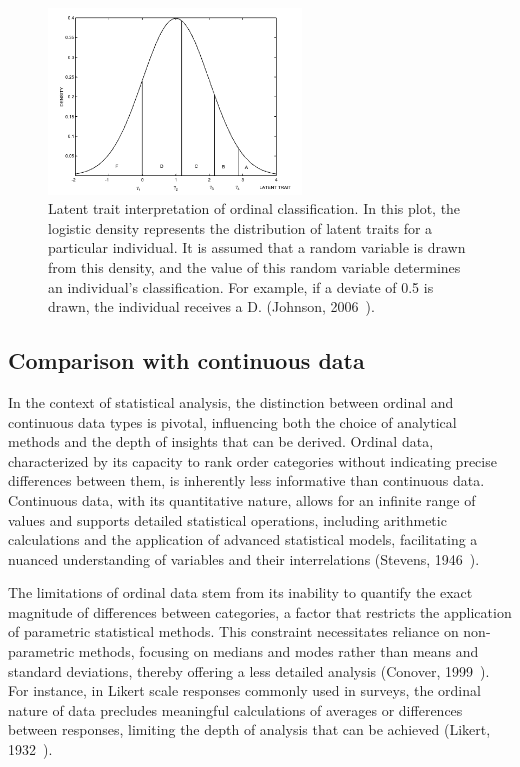 \documentclass{article}
\begin{document}
\begin{figure}[ht!] %
    \centering %
    \includegraphics[width=0.6\textwidth]{images/ordinal_data_dist.png} %
    \caption{Latent trait interpretation of ordinal classification. 
    In this plot, the logistic density represents the distribution of latent traits for a particular individual. 
    It is assumed that a random variable is drawn from this density, and the value of this random variable determines an individual's classification. 
    For example, if a deviate of 0.5 is drawn, the individual receives a D. (Johnson, 2006~\cite{Johnson1999}).} %
    \label{fig:ordinal} %
  \end{figure}

\subsection*{Comparison with continuous data}

In the context of statistical analysis, the distinction between ordinal and continuous data types is pivotal, influencing both the choice of analytical methods and the depth of insights that can be derived. 
Ordinal data, characterized by its capacity to rank order categories without indicating precise differences between them, is inherently less informative than continuous data. 
Continuous data, with its quantitative nature, allows for an infinite range of values and supports detailed statistical operations, including arithmetic calculations and the application of advanced statistical models, facilitating a nuanced understanding of variables and their interrelations (Stevens, 1946~\cite{Stevens1946}).

The limitations of ordinal data stem from its inability to quantify the exact magnitude of differences between categories, a factor that restricts the application of parametric statistical methods. This constraint necessitates reliance on non-parametric methods, focusing on medians and modes rather than means and standard deviations, thereby offering a less detailed analysis (Conover, 1999~\cite{Conover1999}). 
For instance, in Likert scale responses commonly used in surveys, the ordinal nature of data precludes meaningful calculations of averages or differences between responses, limiting the depth of analysis that can be achieved (Likert, 1932~\cite{Likert1932}).
\end{document}
